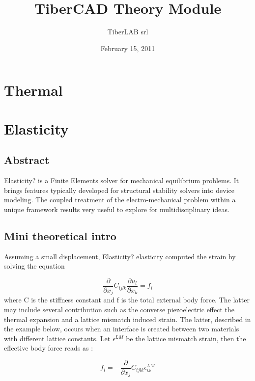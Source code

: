 \documentclass[letterpaper,10pt,english]{sphinxmanual}
\title{TiberCAD Theory Module}
\date{February 15, 2011}
\author{TiberLAB srl}
\begin{document}
\maketitle
\tableofcontents
{}\label{index::doc}



\chapter{Thermal}
\label{Thermal:thermal}\label{Thermal::doc}\label{Thermal:welcome-to-tibercad-s-documentation}\label{Thermal:contents}\label{Thermal:id1}

\chapter{Elasticity}
\label{Elasticity::doc}\label{Elasticity:elasticity}\label{Elasticity:id1}

\section{Abstract}
\label{Elasticity:abstract}
Elasticity? is a Finite Elements solver for mechanical equilibrium problems.
It brings features typically developed for structural stability solvers into device modeling.
The coupled treatment of the electro-mechanical problem within a unique framework results very useful to explore for multidisciplinary ideas.



\section{Mini theoretical intro}
\label{Elasticity:mini-theoretical-intro}
Assuming a small displacement, Elasticity? elasticity computed the strain by solving the equation

\[
\frac{\partial}{\partial x_j}C_{ijlk}\frac{\partial u_l}{\partial x_k} = f_i
\]
where C is the stiffness constant  and f is the total external body force.
The latter may include several contribution such as the converse piezoelectric effect the thermal expansion and a lattice mismatch induced strain.
The latter, described in the example below, occurs when an interface is created between two materials with different lattice constants.
Let $\epsilon^{LM}$ be the lattice mismatch strain, then the effective body force reads as :

 \[
 f_i = -\frac{\partial }{\partial x_j} C_{ijlk}\epsilon_{lk}^{LM}
 \]
\end{document}
